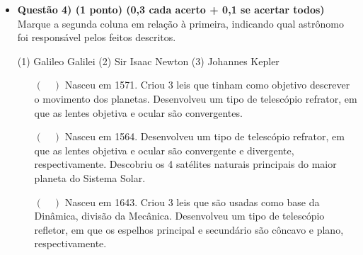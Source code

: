 \documentclass[a4paper, 12pt]{article}
\begin{document}
\begin{itemize}
\begin{multicols}{2}
			\end{multicols}
		\newpage
		\item \textbf{Questão 4) (1 ponto) (0,3 cada acerto + 0,1 se acertar todos)} Marque a segunda coluna em relação à primeira, indicando qual astrônomo foi responsável pelos feitos descritos.
			\begin{multicols}{2}
				\vfill\null \vfill\null
				\begin{flushleft}
					(1) Galileo Galilei \linebreak
					(2) Sir Isaac Newton \linebreak
					(3) Johannes Kepler
				\end{flushleft}
				\vfill\null \vfill\null
				\columnbreak
				\begin{itemize}
					\item[$(\quad)$] Nasceu em 1571. Criou 3 leis que tinham como objetivo descrever o movimento dos planetas. Desenvolveu um tipo de telescópio refrator, em que as lentes objetiva e ocular são convergentes.
					\item[$(\quad)$] Nasceu em 1564. Desenvolveu um tipo de telescópio refrator, em que as lentes objetiva e ocular são convergente e divergente, respectivamente. Descobriu os 4 satélites naturais principais do maior planeta do Sistema Solar.
					\item[$(\quad)$] Nasceu em 1643. Criou 3 leis que são usadas como base da Dinâmica, divisão da Mecânica. Desenvolveu um tipo de telescópio refletor, em que os espelhos principal e secundário são côncavo e plano, respectivamente.
				\end{itemize}
			\end{multicols}


\end{itemize}
\end{document}
